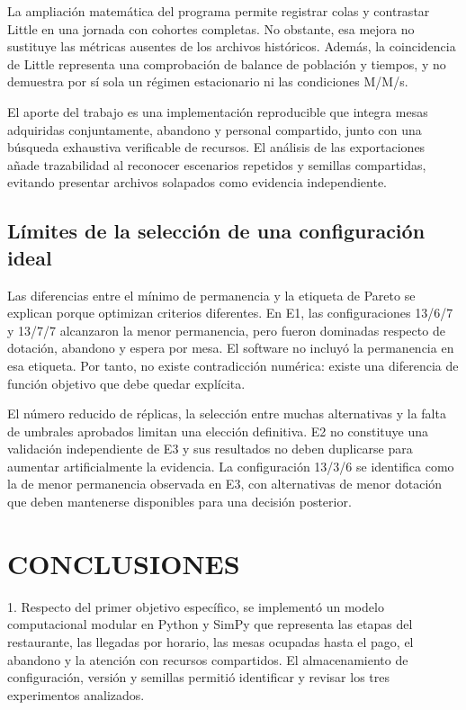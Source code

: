 \documentclass[10pt,a4paper,twocolumn]{article}
\begin{document}
La ampliación matemática del programa permite registrar colas y contrastar Little \cite{ref1} en una jornada con cohortes completas. No obstante, esa mejora no sustituye las métricas ausentes de los archivos históricos. Además, la coincidencia de Little representa una comprobación de balance de población y tiempos, y no demuestra por sí sola un régimen estacionario ni las condiciones M/M/s.

El aporte del trabajo es una implementación reproducible que integra mesas adquiridas conjuntamente, abandono y personal compartido, junto con una búsqueda exhaustiva verificable de recursos. El análisis de las exportaciones añade trazabilidad al reconocer escenarios repetidos y semillas compartidas, evitando presentar archivos solapados como evidencia independiente.

\subsection{Límites de la selección de una configuración ideal}

Las diferencias entre el mínimo de permanencia y la etiqueta de Pareto se explican porque optimizan criterios diferentes. En E1, las configuraciones 13/6/7 y 13/7/7 alcanzaron la menor permanencia, pero fueron dominadas respecto de dotación, abandono y espera por mesa. El software no incluyó la permanencia en esa etiqueta. Por tanto, no existe contradicción numérica: existe una diferencia de función objetivo que debe quedar explícita.

El número reducido de réplicas, la selección entre muchas alternativas y la falta de umbrales aprobados limitan una elección definitiva. E2 no constituye una validación independiente de E3 y sus resultados no deben duplicarse para aumentar artificialmente la evidencia. La configuración 13/3/6 se identifica como la de menor permanencia observada en E3, con alternativas de menor dotación que deben mantenerse disponibles para una decisión posterior.

\section{CONCLUSIONES}

1. Respecto del primer objetivo específico, se implementó un modelo computacional modular en Python y SimPy que representa las etapas del restaurante, las llegadas por horario, las mesas ocupadas hasta el pago, el abandono y la atención con recursos compartidos. El almacenamiento de configuración, versión y semillas permitió identificar y revisar los tres experimentos analizados.
\end{document}
